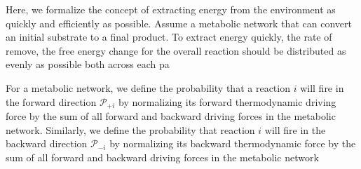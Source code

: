 Here, we formalize the concept of extracting energy from the environment as quickly and efficiently as possible. Assume a metabolic network that can convert an initial substrate to a final product. To extract energy quickly, the rate of remove, the free energy change for the overall reaction should be distributed as evenly as possible both across each pa


For a metabolic network, we define the probability that a reaction $i$ will fire in the forward  direction ${\mathcal P_{+i}}$ by normalizing its forward thermodynamic driving force by the sum of all forward and backward driving forces in the metabolic network. Similarly, we define the probability that reaction $i$ will fire in the backward direction $\mathcal P_{-i}$ by normalizing its backward thermodynamic force by  the sum of all forward and backward driving forces in the metabolic network